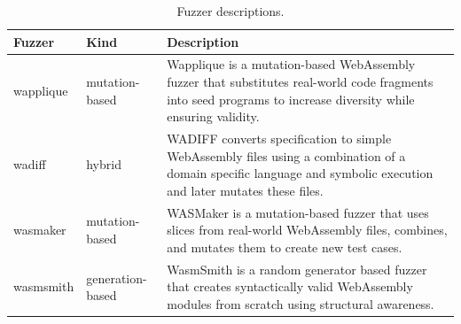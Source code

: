 \begin{table}[]
	\centering
	\scriptsize
	\begin{tabular}{|l|l|p{10cm}|}
		\hline
		\textbf{Fuzzer}   & \textbf{Kind}             & \textbf{Description} \\
		\hline
		wapplique & mutation-based   & Wapplique is a mutation-based WebAssembly fuzzer that substitutes real-world code fragments into seed programs to increase diversity while ensuring validity. \\
		\hline
		wadiff    & hybrid           & WADIFF converts specification to simple WebAssembly files using a combination of a domain specific language and symbolic execution and later mutates these files. \\
		\hline
		wasmaker  & mutation-based   & WASMaker is a mutation-based fuzzer that uses slices from real-world WebAssembly files, combines, and mutates them to create new test cases. \\
		\hline
		wasmsmith & generation-based & WasmSmith is a random generator based fuzzer that creates syntactically valid WebAssembly modules from scratch using structural awareness. \\
		\hline
	\end{tabular}
	\caption{Fuzzer descriptions. }
\end{table}